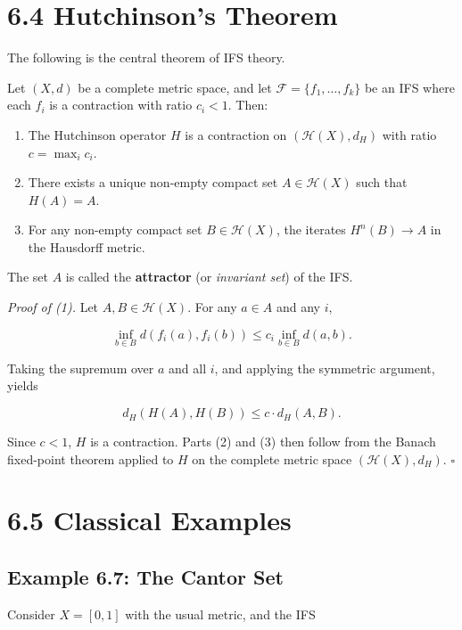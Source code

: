 \section{6.4 Hutchinson's Theorem}

The following is the central theorem of IFS theory.

\begin{theorem}[Hutchinson, 1981]
Let $(X, d)$ be a complete metric space, and let $\mathcal{F} = \{ f_1, \ldots, f_k\} $ be an IFS where each $f_i$ is a contraction with ratio $c_i < 1$. Then:
\end{theorem}

\begin{enumerate}
  \item The Hutchinson operator $H$ is a contraction on $(\mathcal{H}(X), d_H)$ with ratio $c = \max_i c_i$.
  \item There exists a unique non-empty compact set $A \in \mathcal{H}(X)$ such that $H(A) = A$.
  \item For any non-empty compact set $B \in \mathcal{H}(X)$, the iterates $H^n(B) \to A$ in the Hausdorff metric.
\end{enumerate}

The set $A$ is called the \textbf{attractor} (or \textit{invariant set}) of the IFS.

\textit{Proof of (1).} Let $A, B \in \mathcal{H}(X)$. For any $a \in A$ and any $i$,

\[
\inf_{b \in B} d(f_i(a), f_i(b)) \le c_i \inf_{b \in B} d(a, b).
\]

Taking the supremum over $a$ and all $i$, and applying the symmetric argument, yields

\[
d_H(H(A), H(B)) \le c \cdot d_H(A, B).
\]

Since $c < 1$, $H$ is a contraction. Parts (2) and (3) then follow from the Banach fixed-point theorem applied to $H$ on the complete metric space $(\mathcal{H}(X), d_H)$. $\square$

\section{6.5 Classical Examples}

\subsection{Example 6.7: The Cantor Set}

Consider $X = [0, 1]$ with the usual metric, and the IFS

